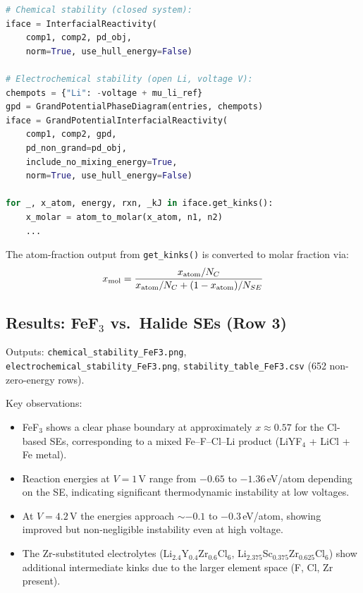 \documentclass[11pt,letterpaper]{article}
\begin{document}
\begin{lstlisting}[language=Python]
# Chemical stability (closed system):
iface = InterfacialReactivity(
    comp1, comp2, pd_obj,
    norm=True, use_hull_energy=False)

# Electrochemical stability (open Li, voltage V):
chempots = {"Li": -voltage + mu_li_ref}
gpd = GrandPotentialPhaseDiagram(entries, chempots)
iface = GrandPotentialInterfacialReactivity(
    comp1, comp2, gpd,
    pd_non_grand=pd_obj,
    include_no_mixing_energy=True,
    norm=True, use_hull_energy=False)

for _, x_atom, energy, rxn, _kJ in iface.get_kinks():
    x_molar = atom_to_molar(x_atom, n1, n2)
    ...
\end{lstlisting}

The atom-fraction output from \texttt{get\_kinks()} is converted to
molar fraction via:
\begin{equation}
  x_{\rm mol} = \frac{x_{\rm atom}/N_C}{x_{\rm atom}/N_C + (1-x_{\rm atom})/N_{SE}}
\end{equation}

\subsection{Results: FeF$_3$ vs.\ Halide SEs (Row 3)}

Outputs: \texttt{chemical\_stability\_FeF3.png},
\texttt{electrochemical\_stability\_FeF3.png},
\texttt{stability\_table\_FeF3.csv} (652 non-zero-energy rows).

Key observations:
\begin{itemize}
  \item FeF$_3$ shows a clear phase boundary at approximately
        $x \approx 0.57$ for the Cl-based SEs, corresponding to a
        mixed Fe--F--Cl--Li product (LiYF$_4$ + LiCl + Fe metal).
  \item Reaction energies at $V=1$\,V range from $-0.65$ to $-1.36$\,eV/atom
        depending on the SE, indicating significant thermodynamic
        instability at low voltages.
  \item At $V=4.2$\,V the energies approach $\sim -0.1$ to $-0.3$\,eV/atom,
        showing improved but non-negligible instability even at high voltage.
  \item The Zr-substituted electrolytes (Li$_{2.4}$Y$_{0.4}$Zr$_{0.6}$Cl$_6$,
        Li$_{2.375}$Sc$_{0.375}$Zr$_{0.625}$Cl$_6$) show additional intermediate
        kinks due to the larger element space (F, Cl, Zr present).
\end{itemize}
\end{document}
